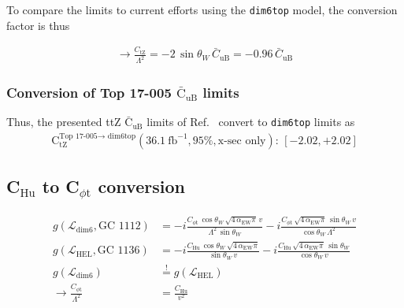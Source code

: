 \documentclass[letterpaper,11pt]{article}
\begin{document}
\noindent
To compare the limits to current efforts using the \texttt{dim6top} model, the conversion factor is thus

\begin{align}
\rightarrow \frac{C_\text{tZ}}{\Lambda^2} = -2\,\sin\theta_W\,\bar{C}_\text{uB} = -0.96\,\bar{C}_\text{uB}
\end{align}

\noindent
{}

\subsubsection{Conversion of Top 17-005 $\bar{\text{C}}_\text{uB}$ limits}

Thus, the presented ttZ $\bar{\text{C}}_\text{uB}$ limits of Ref.~\cite{Sirunyan:2017uzs} convert to \texttt{dim6top} limits as
\begin{align}
\text{C}_\text{tZ}^\text{Top 17-005$\rightarrow$ dim6top}(36.1~\text{fb}^{-1}, 95\%, \text{x-sec only}):\, [-2.02,+2.02]
\end{align}

\subsection{C$_\text{Hu}$ to C$_\text{$\phi$t}$ conversion}

\begin{align}
	g(\mathcal{L}_\text{dim6}, \text{GC 1112}) &= -i\frac{C_{\phi\text{t}}\,\cos\theta_W\,\sqrt{4\,\alpha_\text{EW}\pi}\,v}{\Lambda^2\,\sin\theta_W} - i\frac{C_{\phi\text{t}}\,\sqrt{4\,\alpha_\text{EW}\pi}\,\sin\theta_W\,v}{\cos\theta_W\,\Lambda^2}\\
	g(\mathcal{L}_\text{HEL}, \text{GC 1136}) &= -i\frac{C_\text{Hu}\,\cos\theta_W\,\sqrt{4\,\alpha_\text{EW}\pi}}{\sin\theta_W\,v} - i\frac{C_\text{Hu}\,\sqrt{4\,\alpha_\text{EW}\pi}\,\sin\theta_W}{\cos\theta_W\,v}\\
	g(\mathcal{L}_\text{dim6}) &\stackrel{!}{=} g(\mathcal{L}_\text{HEL})\\
	\rightarrow \frac{C_{\phi\text{t}}}{\Lambda^2} &= \frac{C_\text{Hu}}{v^2}
\end{align}
\end{document}
